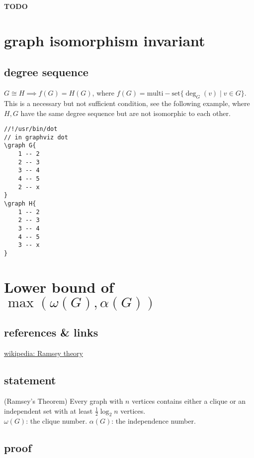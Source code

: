 \documentclass{article}
\begin{document}
\textbf{TODO}



\newpage
\section{graph isomorphism invariant}

\subsection{degree sequence}

$G\cong H\implies f(G)=H(G)$, where $f(G)=\mathrm{multi-set}\{\deg_G(v)\mid v\in G\}$.\\
This is a necessary but not sufficient condition, see the following example, where $H,G$ have the same degree sequence but are not isomorphic to each other.

\begin{verbatim}
//!/usr/bin/dot
// in graphviz dot
\graph G{
	1 -- 2
	2 -- 3
	3 -- 4
	4 -- 5
	2 -- x
}
\graph H{
	1 -- 2
	2 -- 3
	3 -- 4
	4 -- 5
	3 -- x
}
\end{verbatim}


\newpage
\section{Lower bound of $\max(\omega(G),\alpha(G))$}

\subsection{references \& links}
\href{https://en.wikipedia.org/wiki/Ramsey_theory}{wikipedia: Ramsey theory}


\subsection{statement}

(Ramsey's Theorem) Every graph with $n$ vertices contains either a clique or an independent set with at least $\frac{1}{2}\log_2 n$ vertices.\\
$\omega(G)$: the clique number.
$\alpha(G)$: the independence number.

\subsection{proof}
\end{document}
